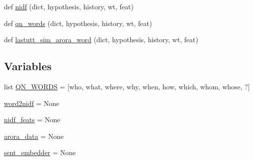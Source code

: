\begin{DoxyCompactItemize}
\item 
def \hyperlink{namespaceprojects_1_1controllable__dialogue_1_1controllable__seq2seq_1_1controls_a27ef93e876c9c12b265bf2eefb65f058}{nidf} (dict, hypothesis, history, wt, feat)
\item 
def \hyperlink{namespaceprojects_1_1controllable__dialogue_1_1controllable__seq2seq_1_1controls_ac09ae7183b65c9bd1f6f1469db84012b}{qn\+\_\+words} (dict, hypothesis, history, wt, feat)
\item 
def \hyperlink{namespaceprojects_1_1controllable__dialogue_1_1controllable__seq2seq_1_1controls_afe0a10c32acfb1a7dd586ac644412589}{lastutt\+\_\+sim\+\_\+arora\+\_\+word} (dict, hypothesis, history, wt, feat)
\end{DoxyCompactItemize}
\subsection*{Variables}
\begin{DoxyCompactItemize}
\item 
list \hyperlink{namespaceprojects_1_1controllable__dialogue_1_1controllable__seq2seq_1_1controls_a6a0de17d1db487cc7d6874f6060126b3}{Q\+N\+\_\+\+W\+O\+R\+DS} = \mbox{[}\textquotesingle{}who\textquotesingle{}, \textquotesingle{}what\textquotesingle{}, \textquotesingle{}where\textquotesingle{}, \textquotesingle{}why\textquotesingle{}, \textquotesingle{}when\textquotesingle{}, \textquotesingle{}how\textquotesingle{}, \textquotesingle{}which\textquotesingle{}, \textquotesingle{}whom\textquotesingle{}, \textquotesingle{}whose\textquotesingle{}, \textquotesingle{}?\textquotesingle{}\mbox{]}
\item 
\hyperlink{namespaceprojects_1_1controllable__dialogue_1_1controllable__seq2seq_1_1controls_ab369652f734d95239a5a72df4bde11e7}{word2nidf} = None
\item 
\hyperlink{namespaceprojects_1_1controllable__dialogue_1_1controllable__seq2seq_1_1controls_a39b4201071be4232cb85fc593ca0f3b4}{nidf\+\_\+feats} = None
\item 
\hyperlink{namespaceprojects_1_1controllable__dialogue_1_1controllable__seq2seq_1_1controls_af1a8cf95077ab1de45a68b6756a3b2a5}{arora\+\_\+data} = None
\item 
\hyperlink{namespaceprojects_1_1controllable__dialogue_1_1controllable__seq2seq_1_1controls_a409b745aac572a3f7c4c345b2dbe0dd5}{sent\+\_\+embedder} = None
\end{DoxyCompactItemize}


